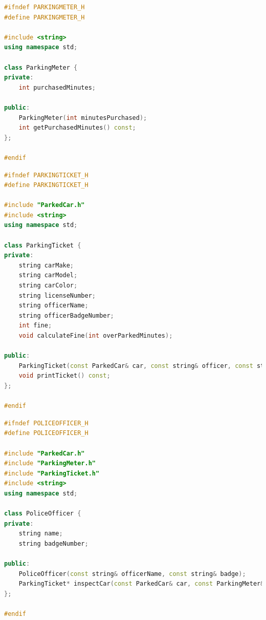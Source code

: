 \documentclass{article}
\begin{document}
\begin{lstlisting}[language=C++, caption={ParkingMeter.h}]
#ifndef PARKINGMETER_H
#define PARKINGMETER_H

#include <string>
using namespace std;

class ParkingMeter {
private:
    int purchasedMinutes;

public:
    ParkingMeter(int minutesPurchased);
    int getPurchasedMinutes() const;
};

#endif
\end{lstlisting}

\begin{lstlisting}[language=C++, caption={ParkingTicket.h}]
#ifndef PARKINGTICKET_H
#define PARKINGTICKET_H

#include "ParkedCar.h"
#include <string>
using namespace std;

class ParkingTicket {
private:
    string carMake;
    string carModel;
    string carColor;
    string licenseNumber;
    string officerName;
    string officerBadgeNumber;
    int fine;
    void calculateFine(int overParkedMinutes);

public:
    ParkingTicket(const ParkedCar& car, const string& officer, const string& badge, int overParkedMinutes);
    void printTicket() const;
};

#endif
\end{lstlisting}

\begin{lstlisting}[language=C++, caption={PoliceOfficer.h}]
#ifndef POLICEOFFICER_H
#define POLICEOFFICER_H

#include "ParkedCar.h"
#include "ParkingMeter.h"
#include "ParkingTicket.h"
#include <string>
using namespace std;

class PoliceOfficer {
private:
    string name;
    string badgeNumber;

public:
    PoliceOfficer(const string& officerName, const string& badge);
    ParkingTicket* inspectCar(const ParkedCar& car, const ParkingMeter& meter) const;
};

#endif
\end{lstlisting}
\end{document}
